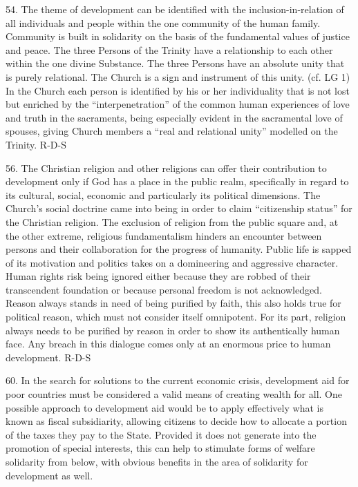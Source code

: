 \documentclass[oneside]{book}
\begin{document}
54. The theme of development can be identified with the inclusion-in-relation of
all individuals and people within the one community of the human
family. Community is built in solidarity on the basis of the fundamental values
of justice and peace. The three Persons of the Trinity have a relationship to
each other within the one divine Substance. The three Persons have an absolute
unity that is purely relational. The Church is a sign and instrument of this
unity. (cf. LG 1) In the Church each person is identified by his or her
individuality that is not lost but enriched by the ``interpenetration'' of the
common human experiences of love and truth in the sacraments, being especially
evident in the sacramental love of spouses, giving Church members a ``real and
relational unity'' modelled on the Trinity.
R-D-S

56. The Christian religion and other religions can offer their contribution to
development only if God has a place in the public realm, specifically in regard
to its cultural, social, economic and particularly its political dimensions. The
Church's social doctrine came into being in order to claim ``citizenship
status'' for the Christian religion. The exclusion of religion from the public
square  and, at the other extreme, religious fundamentalism  hinders an
encounter between persons and their collaboration for the progress of
humanity. Public life is sapped of its motivation and politics takes on a
domineering and aggressive character. Human rights risk being ignored either
because they are robbed of their transcendent foundation or because personal
freedom is not acknowledged. Reason always stands in need of being purified by
faith, this also holds true for political reason, which must not consider itself
omnipotent. For its part, religion always needs to be purified by reason in
order to show its authentically human face. Any breach in this dialogue comes
only at an enormous price to human development.
R-D-S

60. In the search for solutions to the current economic crisis, development aid
for poor countries must be considered a valid means of creating wealth for
all. One possible approach to development aid would be to apply effectively what
is known as fiscal subsidiarity, allowing citizens to decide how to allocate a
portion of the taxes they pay to the State. Provided it does not generate into
the promotion of special interests, this can help to stimulate forms of welfare
solidarity from below, with obvious benefits in the area of solidarity for
development as well.
\end{document}
